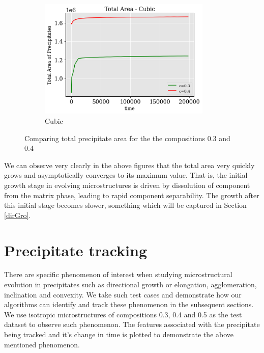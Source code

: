 \documentclass[12pt, a4paper]{report}
\begin{document}
\begin{figure}[H]
\begin{subfigure}{.45\textwidth}
  \centering
  \includegraphics[width=0.9\textwidth]{Pictures/Comparison/Radial Auto comparison/tot_cub.png}
  \caption{Cubic}
  \label{img:microstrImg}
\end{subfigure}
\caption{Comparing total precipitate area for the the compositions 0.3 and 0.4}
\label{fig:test22}
\end{figure}

We can observe very clearly in the above figures that the total area very quickly grows and asymptotically converges to its maximum value. That is, the initial growth stage in evolving microstructures is driven by dissolution of component from the matrix phase, leading to rapid component separability. The growth after this initial stage becomes slower, something which will be captured in Section \ref{dirGro}.


\section{Precipitate tracking}

There are specific phenomenon of interest when studying microstructural evolution in precipitates such as directional growth or elongation, agglomeration, inclination and convexity. We take such test cases and demonstrate how our algorithms can identify and track these phenomenon in the subsequent sections. We use isotropic microstructures of compositions 0.3, 0.4 and 0.5 as the test dataset to observe such phenomenon. The features associated with the precipitate being tracked and it's change in time is plotted to demonstrate the above mentioned phenomenon.
\end{document}
